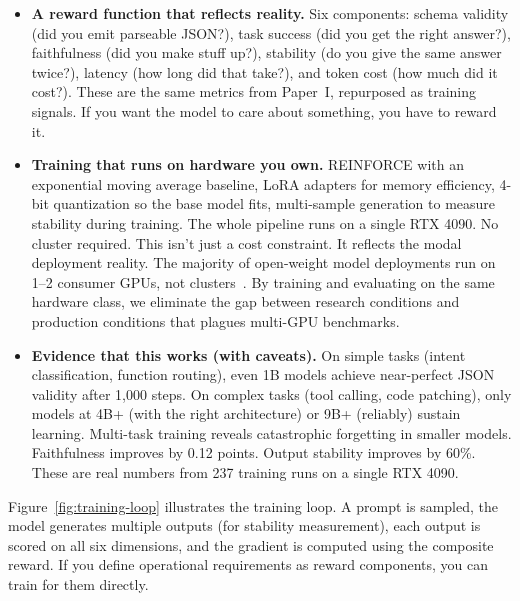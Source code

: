 \documentclass[11pt]{article}
\begin{document}
\begin{itemize}[leftmargin=12pt]
    \item \textbf{A reward function that reflects reality.}
    Six components: schema validity (did you emit parseable JSON?), task success (did you get the right answer?), faithfulness (did you make stuff up?), stability (do you give the same answer twice?), latency (how long did that take?), and token cost (how much did it cost?).
    These are the same metrics from Paper~I, repurposed as training signals.
    If you want the model to care about something, you have to reward it.

    \item \textbf{Training that runs on hardware you own.}
    REINFORCE with an exponential moving average baseline, LoRA adapters for memory efficiency, 4-bit quantization so the base model fits, multi-sample generation to measure stability during training.
    The whole pipeline runs on a single RTX 4090.
    No cluster required.
    This isn't just a cost constraint.  It reflects the modal deployment reality.
    The majority of open-weight model deployments run on 1--2 consumer GPUs, not clusters~\citep{nvidia2025slm}.
    By training and evaluating on the same hardware class, we eliminate the gap between research conditions and production conditions that plagues multi-GPU benchmarks.

    \item \textbf{Evidence that this works (with caveats).}
    On simple tasks (intent classification, function routing), even 1B models achieve near-perfect JSON validity after 1{,}000 steps.
    On complex tasks (tool calling, code patching), only models at 4B+ (with the right architecture) or 9B+ (reliably) sustain learning.
    Multi-task training reveals catastrophic forgetting in smaller models.
    Faithfulness improves by 0.12 points.  Output stability improves by 60\%.
    These are real numbers from 237 training runs on a single RTX 4090.
\end{itemize}

Figure~\ref{fig:training-loop} illustrates the training loop.
A prompt is sampled, the model generates multiple outputs (for stability measurement), each output is scored on all six dimensions, and the gradient is computed using the composite reward.
If you define operational requirements as reward components, you can train for them directly.
\end{document}
